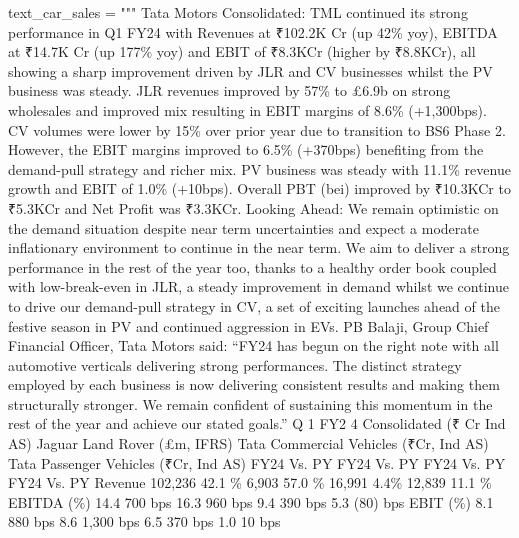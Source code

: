 \documentclass[
  letterpaper,
  DIV=11,
  numbers=noendperiod]{scrreprt}
\newenvironment{Shaded}{\begin{snugshade}}{\end{snugshade}}
\newcommand{\NormalTok}[1]{\textcolor[rgb]{0.00,0.23,0.31}{#1}}
\newcommand{\OperatorTok}[1]{\textcolor[rgb]{0.37,0.37,0.37}{#1}}
\newcommand{\SpecialCharTok}[1]{\textcolor[rgb]{0.37,0.37,0.37}{#1}}
\newcommand{\StringTok}[1]{\textcolor[rgb]{0.13,0.47,0.30}{#1}}
\begin{document}
\begin{Shaded}
\begin{Highlighting}[]
\NormalTok{text\_car\_sales }\OperatorTok{=} \StringTok{"""}
\StringTok{Tata Motors Consolidated:}
\StringTok{TML continued its strong performance in Q1 FY24 with Revenues at ₹102.2K Cr (up 42\% yoy), EBITDA at ₹14.7K Cr (up}
\StringTok{177\% yoy) and EBIT of ₹8.3KCr (higher by ₹8.8KCr), all showing a sharp improvement driven by JLR and CV businesses}
\StringTok{whilst the PV business was steady. JLR revenues improved by 57\% to £6.9b on strong wholesales and improved mix}
\StringTok{resulting in EBIT margins of 8.6\% (+1,300bps). CV volumes were lower by 15}\SpecialCharTok{\% o}\StringTok{ver prior year due to transition to BS6}
\StringTok{Phase 2. However, the EBIT margins improved to 6.5\% (+370bps) benefiting from the demand{-}pull strategy and richer mix.}
\StringTok{PV business was steady with 11.1}\SpecialCharTok{\% r}\StringTok{evenue growth and EBIT of 1.0\% (+10bps). Overall PBT (bei) improved by ₹10.3KCr to}
\StringTok{₹5.3KCr and Net Profit was ₹3.3KCr.}
\StringTok{Looking Ahead:}
\StringTok{We remain optimistic on the demand situation despite near term uncertainties and expect a moderate inflationary}
\StringTok{environment to continue in the near term. We aim to deliver a strong performance in the rest of the year too, thanks to}
\StringTok{a healthy order book coupled with low{-}break{-}even in JLR, a steady improvement in demand whilst we continue to drive}
\StringTok{our demand{-}pull strategy in CV, a set of exciting launches ahead of the festive season in PV and continued aggression in}
\StringTok{EVs.}
\StringTok{PB Balaji, Group Chief Financial Officer, Tata Motors said:}
\StringTok{“FY24 has begun on the right note with all automotive verticals delivering strong performances. The distinct strategy}
\StringTok{employed by each business is now delivering consistent results and making them structurally stronger. We remain}
\StringTok{confident of sustaining this momentum in the rest of the year and achieve our stated goals.”}
\StringTok{Q}
\StringTok{1 FY2}
\StringTok{4}
\StringTok{Consolidated}
\StringTok{(₹ Cr Ind AS)}
\StringTok{Jaguar Land Rover}
\StringTok{(£m, IFRS)}
\StringTok{Tata Commercial}
\StringTok{Vehicles (₹Cr, Ind AS)}
\StringTok{Tata Passenger}
\StringTok{Vehicles (₹Cr, Ind AS)}
\StringTok{FY24 Vs. PY FY24 Vs. PY FY24 Vs. PY FY24 Vs. PY}
\StringTok{Revenue 102,236 42.1 \% 6,903 57.0 \% 16,991 4.4\% 12,839 11.1 \%}
\StringTok{EBITDA (\%) 14.4 700 bps 16.3 960 bps 9.4 390 bps 5.3 (80) bps}
\StringTok{EBIT (\%) 8.1 880 bps 8.6 1,300 bps 6.5 370 bps 1.0 10 bps}

\end{Highlighting}
\end{Shaded}
\end{document}
